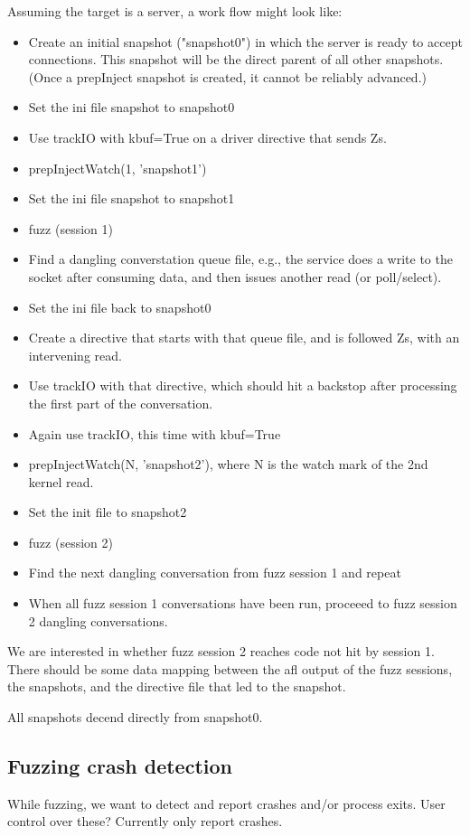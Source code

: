 \documentclass[titlepage]{article}
\begin{document}
\begin{appendices}
Assuming the target is a server, a work flow might look like:
\begin{itemize}
\item Create an initial snapshot ("snapshot0") in which the server is ready to accept connections.  This snapshot
will be the direct parent of all other snapshots. (Once a prepInject snapshot is created, it cannot be reliably
advanced.)
\item Set the ini file snapshot to snapshot0
\item Use trackIO with kbuf=True on a driver directive that sends Zs.
\item prepInjectWatch(1, 'snapshot1')
\item Set the ini file snapshot to snapshot1
\item fuzz (session 1)
\item Find a dangling converstation queue file, e.g., the service does a write to the socket after consuming data, and then issues another read (or poll/select).
\item Set the ini file back to snapshot0
\item Create a directive that starts with that queue file, and is followed Zs, with an intervening read.
\item Use trackIO with that directive, which should hit a backstop after processing the first part of the conversation.
\item Again use trackIO, this time with kbuf=True
\item prepInjectWatch(N, 'snapshot2'), where N is the watch mark of the 2nd kernel read.
\item Set the init file to snapshot2
\item fuzz (session 2)
\item Find the next dangling conversation from fuzz session 1 and repeat
\item When all fuzz session 1 conversations have been run, proceeed to fuzz session 2 dangling conversations.
\end{itemize}

We are interested in whether fuzz session 2 reaches code not hit by session 1.
There should be some data mapping between the afl output of the fuzz sessions, the snapshots,
and the directive file that led to the snapshot.

All snapshots decend directly from snapshot0.

\subsection{Fuzzing crash detection}
While fuzzing, we want to detect and report crashes and/or process exits.
User control over these?  Currently only report crashes.



\end{appendices}
\end{document}
